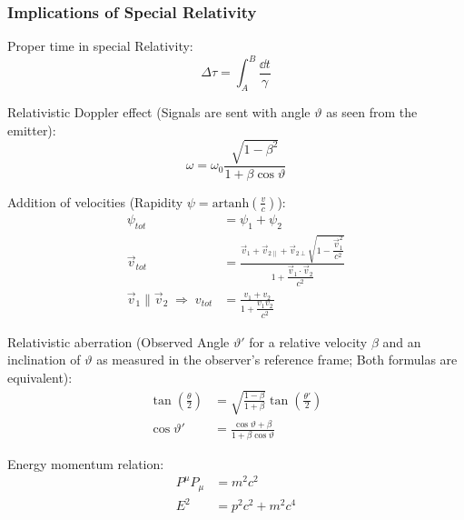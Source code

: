 		\subsubsection{Implications of Special Relativity}
			\noindent
			Proper time in special Relativity:
			\begin{equation}
				\Delta\tau = \int_A^B \frac{\dd t}{\gamma}
			\end{equation}

			\noindent
			Relativistic Doppler effect (Signals are sent with angle $\vartheta$ as seen from the emitter):
			\begin{equation}
				\omega = \omega_0\frac{\sqrt{1-\beta^2}}{1+\beta\cos\vartheta}
			\end{equation}

			\noindent
			Addition of velocities (Rapidity $\psi = \mathrm{artanh}\left(\frac{v}{c}\right)$):
			\begin{equation}
				\begin{aligned}
					\psi_{tot} &= \psi_1+\psi_2 \\
					\vec{v}_{tot} &= \frac{\vec{v}_1+\vec{v}_{2\parallel}+\vec{v}_{2\perp}\sqrt{1-\dfrac{\vec{v}_1^2}{c^2}}}{1+\dfrac{\vec{v}_1\cdot\vec{v}_2}{c^2}} \\
					\vec{v}_1\parallel\vec{v}_2 \;\Rightarrow\; v_{tot} &= \frac{v_1+v_2}{1+\dfrac{v_1 v_2}{c^2}}
				\end{aligned}
			\end{equation}

			\noindent
			Relativistic aberration (Observed Angle $\vartheta'$ for a relative velocity $\beta$ and an inclination of $\vartheta$ as measured in the observer's reference frame; Both formulas are equivalent):
			\begin{equation}
				\begin{aligned}
					\tan\left(\frac{\theta}{2}\right) &= \sqrt{\frac{1-\beta}{1+\beta}}\tan\left(\frac{\theta'}{2}\right)\\
					\cos\vartheta' &= \frac{\cos\vartheta+\beta}{1+\beta\cos\vartheta}
				\end{aligned}
			\end{equation}

			\noindent
			Energy momentum relation:
			\begin{equation}
				\begin{aligned}
					P^\mu P_\mu &= m^2 c^2\\
					E^2 &= p^2 c^2 + m^2 c^4 \\
				\end{aligned}
			\end{equation}
			\newpage
